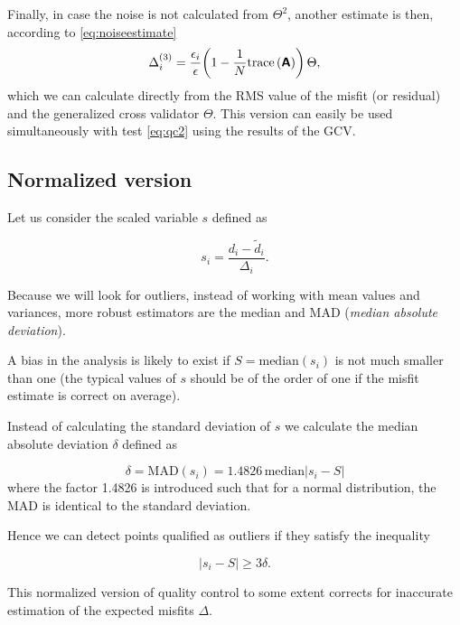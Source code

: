 Finally, in case the noise is not calculated from $\Theta^2$, another estimate is then, according to \eqref{eq:noiseestimate}
\begin{equation}
\Delta_i^{(3)}= \frac{\epsilon_i}{\epsilon} { \left({1-\frac{1}{ N} \mathrm{trace}\left( \mbox{\boldmath $ \protect\mathsf{A} $} \right)}\right)}\, \Theta,
\label{eq:qc3}
\end{equation}
which we can calculate directly from the RMS value of the misfit (or residual) and the generalized cross validator $\Theta$. This version can easily be used simultaneously with test \eqref{eq:qc2} using the results of the GCV.

 
\subsection{Normalized version}

Let us consider the scaled variable $s$ defined as
 
\begin{equation}
s_i = \frac{d_i - \tilde{d}_i}{\Delta_i}.
\end{equation}
 
Because we will look for outliers, instead of working with mean values and variances, more robust 
estimators are the median and $\mathrm{MAD}$ (\textit{median absolute deviation}).
 
A bias in the analysis is likely to exist if $S=\mathrm{median}(s_i)$ is not much smaller than one
(the typical values of $s$ should be of the order of one if the misfit estimate is correct on average).
 
Instead of calculating the standard deviation of $s$ we calculate 
the median absolute deviation  $\delta$ defined as

\begin{equation}
\delta = \mathrm{MAD}(s_i)=1.4826 \, \mathrm{median}| s_i-  S |
\end{equation}
where the factor 1.4826 is introduced such that for a normal distribution, the MAD is identical to the standard deviation.
 
Hence we can detect points qualified as outliers if they satisfy the inequality

\begin{equation}
|s_i-S | \ge 3 \delta.
\label{eq:qc4}
\end{equation}
 
This normalized version of quality control to some extent corrects for inaccurate estimation of the expected misfits $\Delta$.


